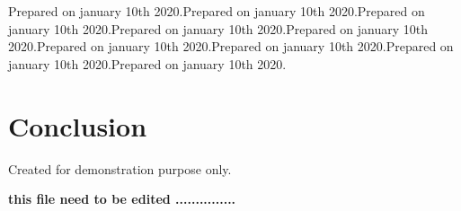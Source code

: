 \documentclass[12pt]{report} %
\begin{document}
\begin{multicols}{2}
Prepared on january 10th 2020.Prepared on january 10th 2020.Prepared on january 10th 2020.Prepared on january 10th 2020.Prepared on january 10th 2020.Prepared on january 10th 2020.Prepared on january 10th 2020.Prepared on january 10th 2020.Prepared on january 10th 2020.



\section{Conclusion} Created for demonstration purpose only.
\end{multicols}
 
\textbf {this file need to be edited ...............}
\end{document}
